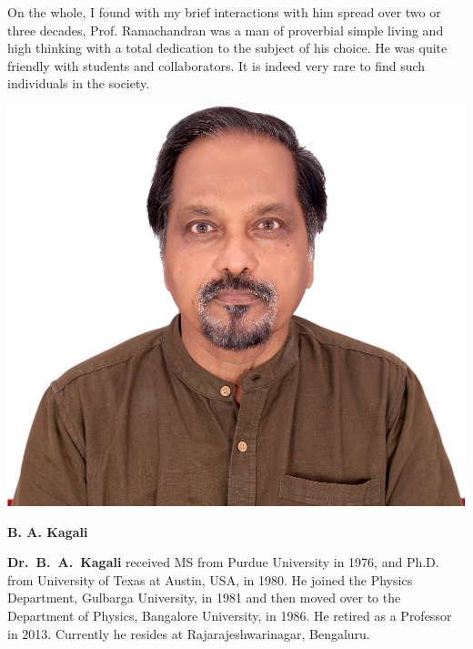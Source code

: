 On the whole, I found with my brief interactions with him spread over two or three decades, Prof. Ramachandran was a man of proverbial simple living and high thinking with a total dedication to the subject of his choice. He was quite friendly with students and collaborators. It is indeed very rare to find such individuals in the society.
\bigskip

\centerline{\includegraphics[scale=.6]{figures/authors/Prof_B_A_Kagali.jpg}}
\centerline{\large\bf B. A. Kagali}
\bigskip

\noindent
\textbf{Dr.~B.~A.~Kagali} received MS from Purdue University in 1976, and Ph.D. from University of Texas at Austin, USA, in 1980. He joined the Physics Department, Gulbarga University, in 1981 and then moved over to the Department of Physics, Bangalore University, in 1986. He retired as a Professor in 2013. Currently he resides at Rajarajeshwarinagar, Bengaluru.
